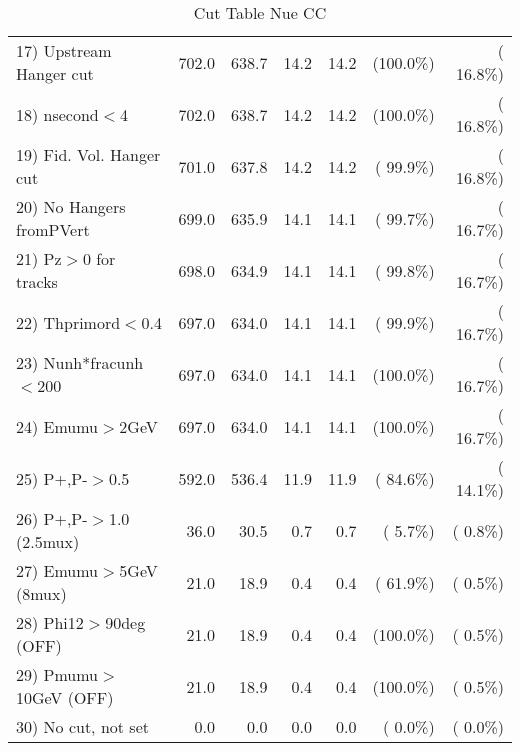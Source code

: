 \begin{table}[h!]
\begin{tabular}{||l||r|r|r|r|r|r||}
 17) Upstream Hanger cut  &        702.0 &        638.7 &         14.2 &         14.2 & (100.0\%) & ( 16.8\%) \\
 18) nsecond$<$4          &        702.0 &        638.7 &         14.2 &         14.2 & (100.0\%) & ( 16.8\%) \\
 19) Fid. Vol. Hanger cut &        701.0 &        637.8 &         14.2 &         14.2 & ( 99.9\%) & ( 16.8\%) \\
 20) No Hangers fromPVert &        699.0 &        635.9 &         14.1 &         14.1 & ( 99.7\%) & ( 16.7\%) \\
 21) Pz$>$0 for tracks    &        698.0 &        634.9 &         14.1 &         14.1 & ( 99.8\%) & ( 16.7\%) \\
 22) Thprimord$<$0.4      &        697.0 &        634.0 &         14.1 &         14.1 & ( 99.9\%) & ( 16.7\%) \\
 23) Nunh*fracunh$<$200   &        697.0 &        634.0 &         14.1 &         14.1 & (100.0\%) & ( 16.7\%) \\
 24) Emumu$>$2GeV         &        697.0 &        634.0 &         14.1 &         14.1 & (100.0\%) & ( 16.7\%) \\
 25) P+,P-$>$0.5          &        592.0 &        536.4 &         11.9 &         11.9 & ( 84.6\%) & ( 14.1\%) \\
 26) P+,P-$>$1.0 (2.5mux) &         36.0 &         30.5 &          0.7 &          0.7 & (  5.7\%) & (  0.8\%) \\
 27) Emumu$>$5GeV  (8mux) &         21.0 &         18.9 &          0.4 &          0.4 & ( 61.9\%) & (  0.5\%) \\
 28) Phi12$>$90deg  (OFF) &         21.0 &         18.9 &          0.4 &          0.4 & (100.0\%) & (  0.5\%) \\
 29) Pmumu$>$10GeV  (OFF) &         21.0 &         18.9 &          0.4 &          0.4 & (100.0\%) & (  0.5\%) \\
 30) No cut, not set      &          0.0 &          0.0 &          0.0 &          0.0 & (  0.0\%) & (  0.0\%) \\
 \hline
 \hline
 \end{tabular}
 \caption{Cut Table   Nue CC  }
 \label{tab-cutheavy_neutrino_1.500}
 \end{table}

